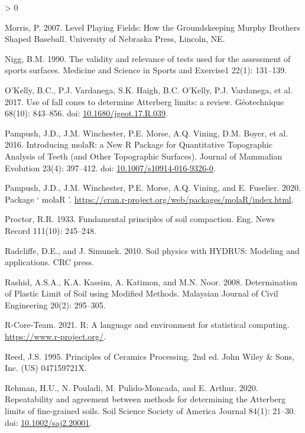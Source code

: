 \documentclass[
  letterpaper,
  openany]{book}
\newlength{\cslhangindent}
\newenvironment{CSLReferences}[2] %
 {%
  \setlength{\parindent}{0pt}
  \ifodd #1 \everypar{\setlength{\hangindent}{\cslhangindent}}\ignorespaces\fi
  \ifnum #2 > 0
  \setlength{\parskip}{#2\baselineskip}
  \fi
 }%
 {}
\begin{document}
\begin{CSLReferences}{1}{0}
\leavevmode\hypertarget{ref-Morris2007}{}%
Morris, P. 2007. {Level Playing Fields: How the Groundskeeping Murphy Brothers Shaped Baseball}. University of Nebraska Press, Lincoln, NE.

\leavevmode\hypertarget{ref-Nigg1990}{}%
Nigg, B.M. 1990. {The validity and relevance of tests used for the assessment of sports surfaces}. Medicine and Science in Sports and Exercise1 22(1): 131--139.

\leavevmode\hypertarget{ref-OKelly2017}{}%
O'Kelly, B.C., P.J. Vardanega, S.K. Haigh, B.C. O'Kelly, P.J. Vardanega, et al. 2017. {Use of fall cones to determine Atterberg limits: a review}. G{é}otechnique 68(10): 843--856. doi: \href{https://doi.org/10.1680/jgeot.17.R.039}{10.1680/jgeot.17.R.039}.

\leavevmode\hypertarget{ref-Pampush2016}{}%
Pampush, J.D., J.M. Winchester, P.E. Morse, A.Q. Vining, D.M. Boyer, et al. 2016. {Introducing molaR: a New R Package for Quantitative Topographic Analysis of Teeth (and Other Topographic Surfaces)}. Journal of Mammalian Evolution 23(4): 397--412. doi: \href{https://doi.org/10.1007/s10914-016-9326-0}{10.1007/s10914-016-9326-0}.

\leavevmode\hypertarget{ref-Pampush2020}{}%
Pampush, J.D., J.M. Winchester, P.E. Morse, A.Q. Vining, and E. Fuselier. 2020. {Package ` molaR '}. \url{https://cran.r-project.org/web/packages/molaR/index.html}.

\leavevmode\hypertarget{ref-Proctor1933a}{}%
Proctor, R.R. 1933. {Fundamental principles of soil compaction}. Eng. News Record 111(10): 245--248.

\leavevmode\hypertarget{ref-Radcliffe2010}{}%
Radcliffe, D.E., and J. Simunek. 2010. {Soil physics with HYDRUS: Modeling and applications.} CRC press.

\leavevmode\hypertarget{ref-Rashid2008}{}%
Rashid, A.S.A., K.A. Kassim, A. Katimon, and M.N. Noor. 2008. {Determination of Plastic Limit of Soil using Modified Methods}. Malaysian Journal of Civil Engineering 20(2): 295--305.

\leavevmode\hypertarget{ref-R-core2021}{}%
R-Core-Team. 2021. {R: A language and environment for statistical computing}. \url{https://www.r-project.org/}.

\leavevmode\hypertarget{ref-Reed1995}{}%
Reed, J.S. 1995. {Principles of Ceramics Processing}. 2nd ed. John Wiley {\&} Sons, Inc. (US) 047159721X.

\leavevmode\hypertarget{ref-Rehman2020}{}%
Rehman, H.U., N. Pouladi, M. Pulido-Moncada, and E. Arthur. 2020. {Repeatability and agreement between methods for determining the Atterberg limits of fine-grained soils}. Soil Science Society of America Journal 84(1): 21--30. doi: \href{https://doi.org/10.1002/saj2.20001}{10.1002/saj2.20001}.


\end{CSLReferences}
\end{document}
